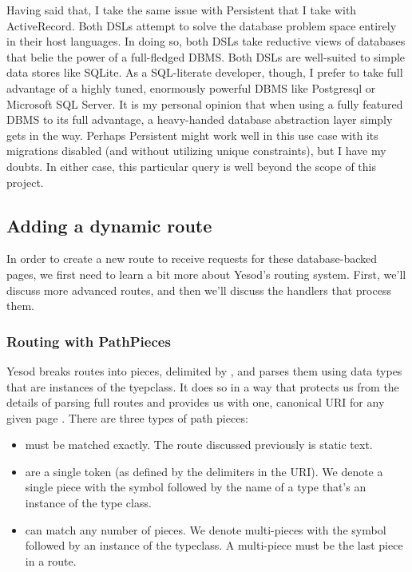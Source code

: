 Having said that, I take the same issue with Persistent that I take with ActiveRecord. Both DSLs attempt to solve the database problem space entirely in their host languages. In doing so, both DSLs take reductive views of databases that belie the power of a full-fledged DBMS. Both DSLs are well-suited to simple data stores like SQLite. As a SQL-literate developer, though, I prefer to take full advantage of a highly tuned, enormously powerful DBMS like Postgresql or Microsoft SQL Server. It is my personal opinion that when using a fully featured DBMS to its full advantage, a heavy-handed database abstraction layer simply gets in the way. Perhaps Persistent might work well in this use case with its migrations disabled (and without utilizing unique constraints), but I have my doubts. In either case, this particular query is well beyond the scope of this project.

\subsection{Adding a dynamic route}

In order to create a new route to receive requests for these database-backed pages, we first need to learn a bit more about Yesod's routing system. First, we'll discuss more advanced routes, and then we'll discuss the handlers that process them.

\subsubsection{Routing with PathPieces}

Yesod breaks routes into pieces, delimited by \code{/}, and parses them using data types that are instances of the  tyepclass. It does so in a way that protects us from the details of parsing full routes and provides us with one, canonical URI for any given page \cite{ybkRouting}. There are three types of path pieces:

\begin{itemize}
  \item {} must be matched exactly. The  route discussed previously is static text.
  \item {} are a single token (as defined by the \code{/} delimiters in the URI). We denote a single piece with the \code{\#} symbol followed by the name of a type that's an instance of the  type class.
  \item {} can match any number of pieces. We denote multi-pieces with the \code{*} symbol followed by an instance of the  typeclass. A multi-piece must be the last piece in a route.
\end{itemize}

